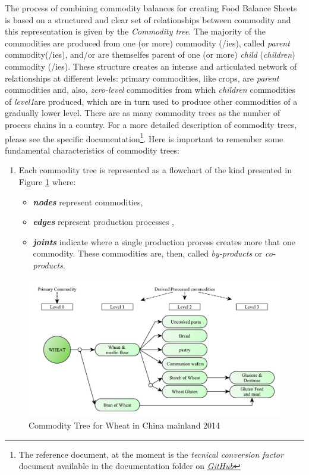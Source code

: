 \documentclass[]{article}
\providecommand{\tightlist}{%
  \setlength{\itemsep}{0pt}\setlength{\parskip}{0pt}}
\let\rmarkdownfootnote\footnote%
\def\footnote{\protect\rmarkdownfootnote}
\begin{document}
The process of combining commodity balances for creating Food Balance
Sheets is based on a structured and clear set of relationships between
commodity and this representation is given by the \emph{Commodity tree}.
The majority of the commodities are produced from one (or more)
commodity (/ies), called \emph{parent} commodity(/ies), and/or are
themselfes parent of one (or more) \emph{child} (\emph{children})
commodity (/ies). These structure creates an intense and articulated
network of relationships at different levels: primary commodities, like
crops, are \emph{parent} commodities and, also, \emph{zero-level}
commodities from which \emph{children} commodities of \emph{level1}are
produced, which are in turn used to produce other commodities of a
gradually lower level. There are as many commodity trees as the number
of process chains in a country. For a more detailed description of
commodity trees, please see the specific documentation\footnote{The
  reference document, at the moment is the \emph{tecnical conversion
  factor} document available in the documentation folder on
  \href{https://github.com/SWS-Methodology/faoswsStandardization/tree/master/documentation}{\emph{GitHub}}}.
Here is important to remember some fundamental characteristics of
commodity trees:

\begin{enumerate}
\def\labelenumi{\arabic{enumi}.}
\tightlist
\item
  Each commodity tree is represented as a flowchart of the kind
  presented in Figure \ref{fig:f2} where:

  \begin{itemize}
  \tightlist
  \item
    \textbf{\emph{nodes}} represent commodities,
  \item
    \textbf{\emph{edges}} represent production processes ,
  \item
    \textbf{\emph{joints}} indicate where a single production process
    creates more that one commodity. These commodities are, then, called
    \emph{by-products} or \emph{co-products}.
  \end{itemize}
\end{enumerate}

\begin{figure}[H]

{\centering \includegraphics{images/02_WheatTree} 

}

\caption{\label{fig:f2}Commodity Tree for Wheat in China mainland 2014}\label{fig:f2}
\end{figure}
\end{document}
